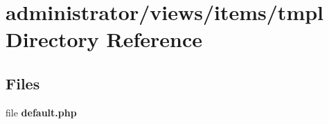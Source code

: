 \section{administrator/views/items/tmpl Directory Reference}
\label{dir_931d8c85877427043d8d7ae1e679b96d}
\subsection*{Files}
\begin{DoxyCompactItemize}
\item 
file \textbf{ default.\+php}
\end{DoxyCompactItemize}
